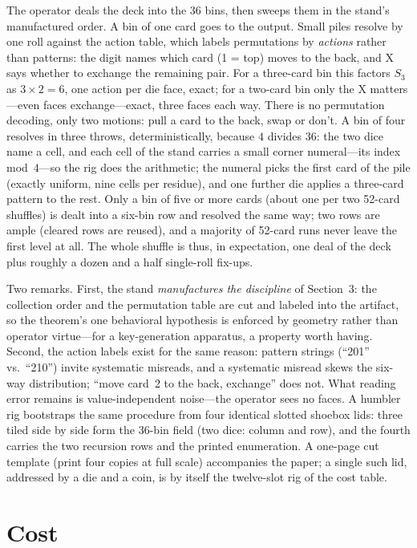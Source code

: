 \documentclass[11pt]{article}
\begin{document}
The operator deals the deck into the 36 bins, then sweeps them in the
stand's manufactured order. A bin of one card goes to the output. Small piles resolve by one roll against the
action table, which labels permutations by \emph{actions} rather than
patterns: the digit names which card (1 = top) moves to the back, and X
says whether to exchange the remaining pair. For a three-card bin this
factors $S_3$ as $3 \times 2 = 6$, one action per die face, exact; for
a two-card bin only the X matters---even faces exchange---exact, three
faces each way. There is no permutation decoding, only two motions:
pull a card to the back, swap or don't. A bin of four resolves in three throws,
deterministically, because $4$ divides $36$: the two dice name a cell,
and each cell of the stand carries a small corner numeral---its index
mod~$4$---so the rig does the arithmetic; the numeral picks the first
card of the pile (exactly uniform, nine cells per residue), and one
further die applies a three-card pattern to the rest. Only a bin of
five or more cards (about one per two 52-card shuffles) is dealt into a
six-bin row and resolved the same way; two rows are ample (cleared rows
are reused), and a majority of 52-card runs never leave the first level
at all. The whole shuffle is thus, in expectation, one deal of the deck
plus roughly a dozen and a half single-roll fix-ups.

Two remarks. First, the stand \emph{manufactures the discipline} of
Section~3: the collection order and the permutation table are cut and
labeled into the artifact, so the theorem's one behavioral hypothesis
is enforced by geometry rather than operator virtue---for a
key-generation apparatus, a property worth having. Second, the
action labels exist for the same reason: pattern strings (``201'' vs.\
``210'') invite systematic misreads, and a systematic misread skews the
six-way distribution; ``move card~2 to the back, exchange'' does not.
What reading error remains is value-independent noise---the operator
sees no faces. A humbler rig
bootstraps the same procedure from four identical slotted shoebox
lids: three tiled side by side form the 36-bin field (two dice: column
and row), and the fourth carries the two recursion rows and the printed
enumeration. A one-page cut template (print four copies at full scale)
accompanies the paper; a single such lid, addressed by a die and a
coin, is by itself the twelve-slot rig of the cost table.

\section{Cost}
\end{document}
